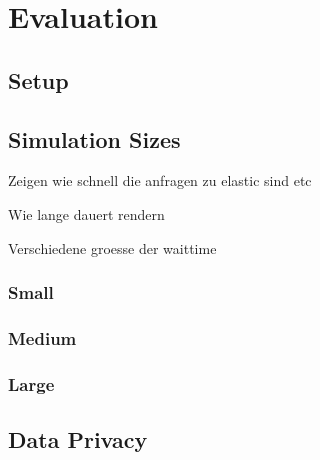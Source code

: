 \chapter{Evaluation}

\section{Setup}
\label{Setup}

\section{Simulation Sizes}
\label{Simulation Sizes}

Zeigen wie schnell die anfragen zu elastic sind etc

Wie lange dauert rendern

Verschiedene groesse der waittime

\subsection{Small}
\label{Small}

\subsection{Medium}
\label{Medium}

\subsection{Large}
\label{Large}

\section{Data Privacy}
\label{Data Privacy}